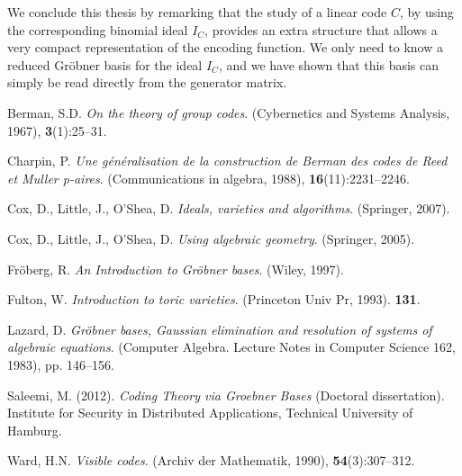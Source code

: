 \documentclass[english,bachelor]{liumaiex}
\begin{document}
We conclude this thesis by remarking that the study of a linear code $C$, by using the corresponding binomial ideal $I_C$, provides an extra structure that allows a very compact representation of the encoding function. We only need to know a reduced Gröbner basis for the ideal $I_C$, and we have shown that this basis can simply be read directly from the generator matrix.

\begin{thebibliography}{99}
Berman, S.D. \emph{On the theory of group codes}. (Cybernetics and Systems Analysis, 1967), \textbf{3}(1):25–31.

Charpin, P. \emph{Une généralisation de la construction de Berman des codes de Reed et Muller p-aires}. (Communications in algebra, 1988), \textbf{16}(11):2231–2246.

Cox, D., Little, J., O'Shea, D. \emph{Ideals, varieties and algorithms}. (Springer, 2007).

Cox, D., Little, J., O'Shea, D. \emph{Using algebraic geometry}. (Springer, 2005).

Fröberg, R. \emph{An Introduction to Gröbner bases}. (Wiley, 1997).

Fulton, W. \emph{Introduction to toric varieties}. (Princeton Univ Pr, 1993). \textbf{131}.

Lazard, D. \emph{Gröbner bases, Gaussian elimination and resolution of systems of algebraic equations}. (Computer Algebra. Lecture Notes in Computer Science 162, 1983), pp. 146–156.

Saleemi, M. (2012). \emph{Coding Theory via Groebner Bases} (Doctoral dissertation). Institute for Security in Distributed Applications, Technical University of Hamburg.

Ward, H.N. \emph{Visible codes}. (Archiv der Mathematik, 1990), \textbf{54}(3):307–312.
\end{thebibliography}
\printindex
\end{document}
